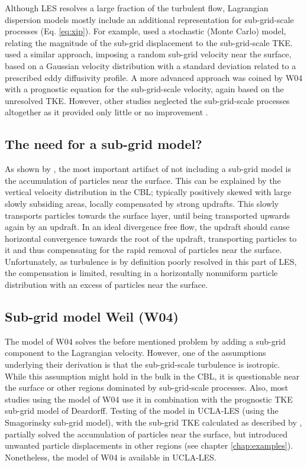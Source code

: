 \documentclass[twoside,a4paper]{report}
\begin{document}
Although LES resolves a large fraction of the turbulent flow, Lagrangian dispersion models mostly include an additional representation for sub-grid-scale processes (Eq. \ref{eq:xip}). For example, \cite{lamb1978} used a stochastic (Monte Carlo) model, relating the magnitude of the sub-grid displacement to the sub-grid-scale TKE. \cite{mason1992} used a similar approach, imposing a random sub-grid velocity near the surface, based on a Gaussian velocity distribution with a standard deviation related to a prescribed eddy diffusivity profile. A more advanced approach was coined by W04 with a prognostic equation for the sub-grid-scale velocity, again based on the unresolved TKE. However, other studies neglected the sub-grid-scale processes altogether as it provided only little or no improvement \citep{Gopal2000,dosio2005,yamaguchi2012}.

\subsection{The need for a sub-grid model?}

As shown by \cite[][Fig. A1]{heus2008}, the most important artifact of not including a sub-grid model is the accumulation of particles near the surface. This can be explained by the vertical velocity distribution in the CBL; typically positively skewed \citep[e.g.][]{Stull1988} with large slowly subsiding areas, locally compensated by strong updrafts. This slowly transports particles towards the surface layer, until being transported upwards again by an updraft. In an ideal  divergence free flow, the updraft should cause horizontal convergence towards the root of the updraft, transporting particles to it and thus compensating for the rapid removal of particles near the surface. Unfortunately, as turbulence is by definition poorly resolved in this part of LES, the compensation is limited, resulting in a horizontally nonuniform particle distribution with an excess of particles near the surface.

\subsection{Sub-grid model Weil (W04)}

The model of W04 solves the before mentioned problem \citep{heus2008} by adding a sub-grid component to the Lagrangian velocity. However, one of the assumptions underlying their derivation is that the sub-grid-scale turbulence is isotropic. While this assumption might hold in the bulk in the CBL, it is questionable near the surface or other regions dominated by sub-grid-scale processes. Also, most studies using the model of W04 use it in combination with the prognostic TKE sub-grid model of Deardorff. Testing of the model in UCLA-LES (using the Smagorinsky sub-grid model), with the sub-grid TKE calculated as described by \cite{stevens1999}, partially solved the accumulation of particles near the surface, but introduced unwanted particle displacements in other regions (see chapter \ref{chap:examples}). Nonetheless, the model of W04 is available in UCLA-LES.\newline
\end{document}
